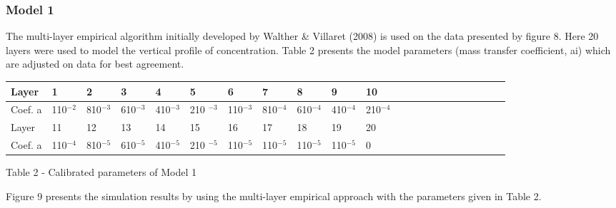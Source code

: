 \subsubsection*{Model 1}

The multi-layer empirical algorithm initially developed by Walther \&
Villaret (2008) is used on the data presented by figure 8. Here 20 layers
were used to model the vertical profile of concentration. Table 2 presents
the model parameters (mass transfer coefficient, ai) which are adjusted on
data for best agreement.

\begin{tabular}{|p{0.344in}|p{0.385in}|p{0.365in}|p{0.365in}|p{0.365in}|p{0.365in}|p{0.366in}|p{0.366in}|p{0.366in}|p{0.366in}|p{0.366in}|p{0.044in}|p{0.044in}|p{0.044in}|p{0.044in}|p{0.044in}|p{0.044in}|p{0.044in}|p{0.044in}|p{0.044in}|p{0.044in}|p{0.044in}|}
\hline
{\raggedright Layer} & {\raggedright 1} & {\raggedright 2} & {\raggedright 3}
& {\raggedright 4} & {\raggedright 5} & {\raggedright 6} & {\raggedright 7}
& {\raggedright 8} & {\raggedright 9} & {\raggedright 10} &  &  &  &  &  & 
&  &  &  &  &  \\ \hline
{\raggedright Coef. a} & {\raggedright 110$^{-2}$} & {\raggedright 810$^{-3}$%
} & {\raggedright 610$^{-3}$} & {\raggedright 410$^{-3}$} & {\raggedright 210%
$^{-3}$} & {\raggedright 110$^{-3}$} & {\raggedright 810$^{-4}$} & {%
\raggedright 610$^{-4}$} & {\raggedright 410$^{-4}$} & {\raggedright 210$%
^{-4}$} &  &  &  &  &  &  &  &  &  &  &  \\ \hline
{\raggedright Layer } & {\raggedright 11} & {\raggedright 12} & {%
\raggedright 13} & {\raggedright 14} & {\raggedright 15} & {\raggedright 16}
& {\raggedright 17} & {\raggedright 18} & {\raggedright 19} & {\raggedright %
20} &  &  &  &  &  &  &  &  &  &  &  \\ \hline
{\raggedright Coef. a} & {\raggedright 110$^{-4}$} & {\raggedright 810$^{-5}$%
} & {\raggedright 610$^{-5}$} & {\raggedright 410$^{-5}$} & {\raggedright 210%
$^{-5}$} & {\raggedright 110$^{-5}$} & {\raggedright 110$^{-5}$} & {%
\raggedright 110$^{-5}$} & {\raggedright 110$^{-5}$} & {\raggedright 0} &  & 
&  &  &  &  &  &  &  &  &  \\ \hline
\end{tabular}

Table 2 - Calibrated parameters of Model 1

Figure 9 presents the simulation results by using the multi-layer empirical
approach with the parameters given in Table 2.\newline

